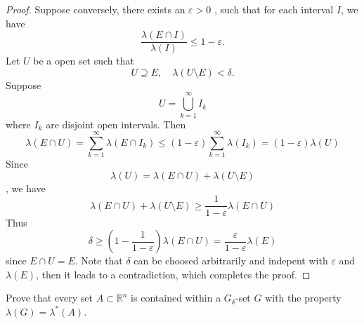 \documentclass[../main.tex]{subfiles}
\begin{document}
\begin{proof}
     Suppose conversely, there exists an \(   \varepsilon > 0  \) , such that for each interval \(  I  \), we have \[
     \frac{ \lambda \left( E\cap I \right)  }{ \lambda \left( I \right)  }\le 1- \varepsilon .  
     \]  Let \(  U   \) be a open set such that \[
     U\supseteq E,\quad  \lambda \left( U\setminus E \right)<  \delta  .
     \] Suppose \[
     U=  \bigcup _{k = 1}^{\infty} I _{k}
     \] where \(  I _{k}  \) are disjoint open intervals. Then \[
      \lambda \left( E\cap U \right) = \sum _{k = 1}^{\infty}  \lambda \left( E\cap I _{k} \right) \le  \left( 1- \varepsilon  \right) \sum _{k = 1} ^{\infty}\lambda \left( I _{k} \right) = \left( 1- \varepsilon  \right) \lambda \left( U \right)    
     \]  Since \[
       \lambda \left( U \right)=  \lambda \left( E\cap U \right)+  \lambda \left( U\setminus E \right)   
       \], we have \[
      \lambda \left( E\cap U \right)+  \lambda \left( U\setminus E \right) \ge  \frac{1 }{1- \varepsilon  } \lambda \left( E\cap U \right)    
     \] Thus \[
      \delta \ge \left( 1-\frac{1 }{1- \varepsilon  }  \right) \lambda \left( E\cap U \right)  = \frac{ \varepsilon  }{1- \varepsilon  } \lambda \left( E \right)  
     \] since \(  E\cap U= E  \).  Note that \(   \delta   \) can be choosed arbitrarily and indepent with \(   \varepsilon   \) and \(   \lambda \left( E \right)   \), then it leads to a contradiction, which completes the proof.  
\end{proof}
 \begin{exercise}{}{}
    Prove that every set $A \subset \mathbb{R}^n$ is contained within a $G_{\delta}$-set $G$ with the property $\lambda(G) = \lambda^*(A)$.
 \end{exercise}
\end{document}
